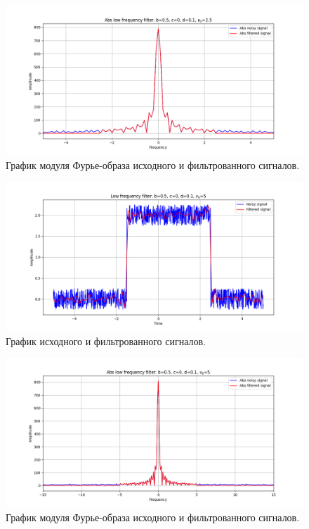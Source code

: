 \documentclass[a4paper, 12pt]{article}
\begin{document}
    \begin{figure}[!htb]
        \centering
        \includegraphics[scale=0.485]{13_abs_u_U_nohigh.png}
        \captionsetup{skip=0pt}
        \caption{График модуля Фурье-образа исходного и фильтрованного сигналов.}
        \label{fig:fig16}
    \end{figure}
    \begin{figure}[!htb]
        \centering
        \includegraphics[scale=0.485]{8_u_flt_u_nohigh.png}
        \captionsetup{skip=0pt}
        \caption{График исходного и фильтрованного сигналов.}
        \label{fig:fig17}
    \end{figure}
    \begin{figure}[!htb]
        \centering
        \includegraphics[scale=0.485]{8_abs_u_U_nohigh.png}
        \captionsetup{skip=0pt}
        \caption{График модуля Фурье-образа исходного и фильтрованного сигналов.}
        \label{fig:fig18}
    \end{figure}
\end{document}
